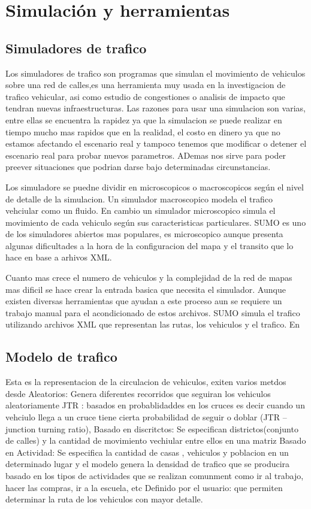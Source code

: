 \section{Simulación y herramientas}
\subsection{Simuladores de trafico}
Los simuladores de trafico son programas que simulan el movimiento de vehiculos sobre una red de calles,es una herramienta muy usada en la investigacion de trafico vehicular, asi como estudio de congestiones o analisis de impacto que tendran nuevas infraestructuras.  Las razones para usar una simulacion son varias, entre ellas se encuentra  la rapidez  ya que la simulacion se puede realizar en tiempo mucho mas rapidos que en la realidad, el costo en dinero ya que no estamos afectando el escenario real  y tampoco tenemos que modificar o detener el escenario real para probar nuevos parametros. ADemas nos sirve para poder preever situaciones que podrian darse bajo determinadas circunstancias.

Los simuladore se puedne dividir en microscopicos o macroscopicos según el nivel de detalle de la simulacion. Un simulador macroscopico modela  el trafico vehciular como un fluido. En cambio un simulador microscopico simula el movimiento de cada vehiculo según sus caracteristicas particulares.
SUMO es uno de los simuladores abiertos mas populares,  es microscopico aunque presenta algunas dificultades a la hora de la configuracion del mapa y el transito que lo hace en base a arhivos XML.

Cuanto mas crece el numero de vehiculos y la complejidad de la red de mapas mas dificil se hace crear la entrada basica que necesita el simulador. Aunque existen diversas herramientas que ayudan a este proceso aun se requiere un trabajo manual para el acondicionado de estos archivos.
SUMO simula el trafico utilizando archivos XML que representan las rutas, los vehiculos y el trafico. En 

\subsection{Modelo de trafico }
Esta es la representacion de la circulacion de vehiculos, exiten varios metdos desde 
Aleatorios: Genera diferentes recorridos que seguiran los vehiculos aleatoriamente
JTR : basados en probablidaddes en los cruces  es decir cuando un vehciulo llega a un cruce tiene cierta probabilidad de seguir o doblar (JTR – junction turning ratio), 
Basado en discritctos:  Se especifican districtos(conjunto de calles) y  la cantidad de movimiento vechiular entre ellos en una  matriz
Basado en Actividad: Se especifica la cantidad de casas , vehiculos y poblacion en un determinado lugar y el modelo genera la densidad de trafico que se producira basado en los tipos de actividades que se realizan comunment como ir al trabajo, hacer las compras, ir a la escuela,  etc
Definido por el usuario: que permiten determinar la ruta de los vehiculos con mayor detalle.

